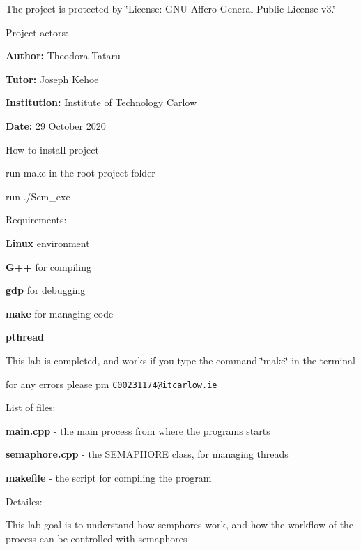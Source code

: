 
\begin{DoxyEnumerate}
\item The project is protected by \char`\"{}\+License\+: G\+N\+U Affero General Public License v3.\char`\"{}
\item Project actors\+:
\begin{DoxyItemize}
\item {\bfseries Author\+:} Theodora Tataru
\item {\bfseries Tutor\+:} Joseph Kehoe
\item {\bfseries Institution\+:} Institute of Technology Carlow
\item {\bfseries Date\+:} 29 October 2020
\end{DoxyItemize}
\item How to install project
\begin{DoxyItemize}
\item run make in the root project folder
\item run ./\+Sem\+\_\+exe
\end{DoxyItemize}
\item Requirements\+:
\begin{DoxyItemize}
\item {\bfseries  Linux } environment
\item {\bfseries  G++ } for compiling
\item {\bfseries  gdp } for debugging
\item {\bfseries  make } for managing code
\item {\bfseries  pthread }
\end{DoxyItemize}
\item This lab is completed, and works if you type the command \char`\"{}make\char`\"{} in the terminal
\begin{DoxyItemize}
\item for any errors please pm \href{mailto:C00231174@itcarlow.ie}{\tt C00231174@itcarlow.\+ie}
\end{DoxyItemize}
\item List of files\+:
\begin{DoxyItemize}
\item {\bfseries \hyperlink{main_8cpp}{main.\+cpp} }-\/ the main process from where the programs starts
\item {\bfseries \hyperlink{_semaphore_8cpp}{semaphore.\+cpp} }-\/ the S\+E\+M\+A\+P\+H\+O\+RE class, for managing threads
\item {\bfseries makefile }-\/ the script for compiling the program
\end{DoxyItemize}
\item Detailes\+:
\begin{DoxyItemize}
\item This lab goal is to understand how semphores work, and how the workflow of the process can be controlled with semaphores 
\end{DoxyItemize}
\end{DoxyEnumerate}